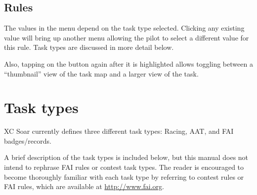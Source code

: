 \subsection*{Rules}
The values in the menu depend on the task type selected. Clicking any existing 
 value will bring up another menu allowing the pilot to select a 
different value for this rule.  Task types are discussed in more detail below.

Also, tapping on the  button again after it is highlighted allows 
toggling between a ``thumbnail'' view of the task map and a larger view of the task.

\section{Task types}
XC Soar currently defines three different task types: Racing, AAT, and FAI badges/records.

A brief description of the task types is included below, but this manual does 
not intend to rephrase FAI rules or contest task types. The reader is encouraged 
to become thoroughly familiar with each task type by referring to contest rules 
or FAI rules, which are available at \url{http://www.fai.org}. 


